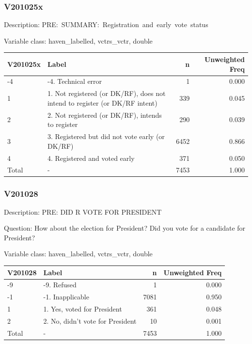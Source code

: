 \documentclass[
]{krantz}
\begin{document}
\hypertarget{v201025x}{%
\subsubsection*{V201025x}\label{v201025x}}


Description: PRE:~SUMMARY:~Registration~and~early~vote~status

Variable class: haven\_labelled, vctrs\_vctr, double

\begin{tabular}[t]{l|l|r|r}
\hline
V201025x & Label & n & Unweighted Freq\\
\hline
-4 & -4. Technical error & 1 & 0.000\\
\hline
1 & 1. Not registered (or DK/RF), does not intend to register (or DK/RF intent) & 339 & 0.045\\
\hline
2 & 2. Not registered (or DK/RF), intends to register & 290 & 0.039\\
\hline
3 & 3. Registered but did not vote early (or DK/RF) & 6452 & 0.866\\
\hline
4 & 4. Registered and voted early & 371 & 0.050\\
\hline
Total & - & 7453 & 1.000\\
\hline
\end{tabular}

\hypertarget{v201028}{%
\subsubsection*{V201028}\label{v201028}}


Description: PRE: DID R VOTE FOR PRESIDENT

Question: How about the election for President? Did you vote for a candidate for President?

Variable class: haven\_labelled, vctrs\_vctr, double

\begin{tabular}[t]{l|l|r|r}
\hline
V201028 & Label & n & Unweighted Freq\\
\hline
-9 & -9. Refused & 1 & 0.000\\
\hline
-1 & -1. Inapplicable & 7081 & 0.950\\
\hline
1 & 1. Yes, voted for President & 361 & 0.048\\
\hline
2 & 2. No, didn't vote for President & 10 & 0.001\\
\hline
Total & - & 7453 & 1.000\\
\hline
\end{tabular}
\end{document}
